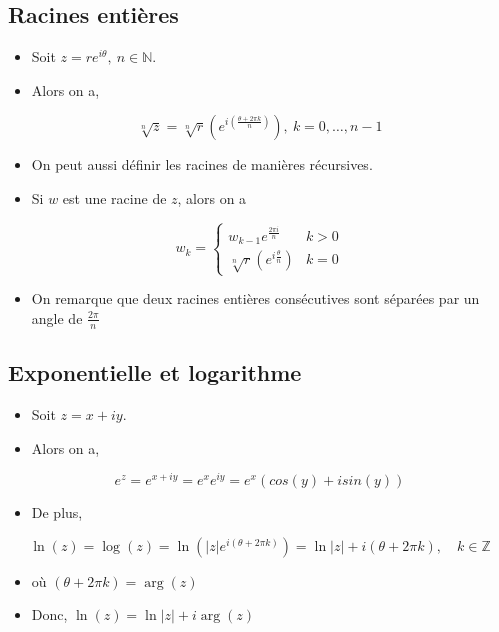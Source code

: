 \subsection*{Racines entières}
\begin{itemize}
    \item[] Soit $z = re^{i\theta},\ n \in \mathbb{N}$.
    \item[] Alors on a,
\end{itemize}
    \begin{equation*}
        \sqrt[n]{z} = \sqrt[n]{r} \left( e^{i \left( \frac{\theta + 2\pi k}{n} \right) } \right), \ k = 0, \dots, n - 1
    \end{equation*} 
\begin{itemize}
  \item[] On peut aussi définir les racines de manières récursives.
  \item[] Si $w$ est une racine de $z$, alors on a
\end{itemize}
    \begin{equation*}
        w_k = \begin{cases} 
            w_{k - 1}e^{ \frac{2\pi i}{n} } & k > 0 \\[0.5em]
            \sqrt[n]{r} \left( e^{i \frac{\theta}{n} } \right) & k = 0
        \end{cases}
    \end{equation*} 
\begin{itemize}
   \item[] On remarque que deux racines entières consécutives sont séparées par un angle de $\frac{2\pi}{n}$    
\end{itemize}


\subsection*{Exponentielle  et logarithme}
\begin{itemize}
    \item[] Soit $z = x + iy$. 
    \item[] Alors on a,
\end{itemize}
\begin{equation*}
    e^z = e^{x + iy} = e^x e^{iy} = e^x (cos(y) + isin(y)) 
\end{equation*}
\begin{itemize}
    \item[] De plus,
\end{itemize}
\begin{equation*}
    \ln(z) = \log(z) = \ln(|z|e^{i(\theta + 2\pi k)}) = \ln|z| + i(\theta + 2\pi k), \quad k \in \mathbb{Z}
\end{equation*}
\begin{itemize}
    \item[] où $(\theta + 2\pi k) = \arg(z)$ 
    \item[] Donc, $\ln(z) = \ln|z| + i\arg(z)$
\end{itemize}


